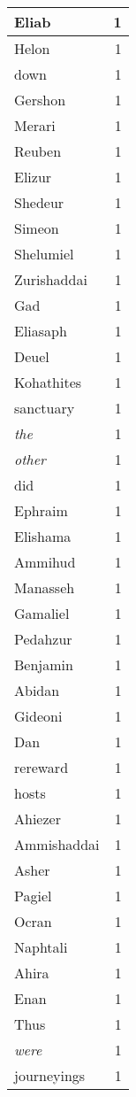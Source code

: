 \begin{center}
\begin{longtable}{l|r}
Eliab & 1 \\ \hline
Helon & 1 \\ \hline
down & 1 \\ \hline
Gershon & 1 \\ \hline
Merari & 1 \\ \hline
Reuben & 1 \\ \hline
Elizur & 1 \\ \hline
Shedeur & 1 \\ \hline
Simeon & 1 \\ \hline
Shelumiel & 1 \\ \hline
Zurishaddai & 1 \\ \hline
Gad & 1 \\ \hline
Eliasaph & 1 \\ \hline
Deuel & 1 \\ \hline
Kohathites & 1 \\ \hline
sanctuary & 1 \\ \hline
\emph{the} & 1 \\ \hline
\emph{other} & 1 \\ \hline
did & 1 \\ \hline
Ephraim & 1 \\ \hline
Elishama & 1 \\ \hline
Ammihud & 1 \\ \hline
Manasseh & 1 \\ \hline
Gamaliel & 1 \\ \hline
Pedahzur & 1 \\ \hline
Benjamin & 1 \\ \hline
Abidan & 1 \\ \hline
Gideoni & 1 \\ \hline
Dan & 1 \\ \hline
rereward & 1 \\ \hline
hosts & 1 \\ \hline
Ahiezer & 1 \\ \hline
Ammishaddai & 1 \\ \hline
Asher & 1 \\ \hline
Pagiel & 1 \\ \hline
Ocran & 1 \\ \hline
Naphtali & 1 \\ \hline
Ahira & 1 \\ \hline
Enan & 1 \\ \hline
Thus & 1 \\ \hline
\emph{were} & 1 \\ \hline
journeyings & 1 \\ \hline

\end{longtable}
\end{center}
